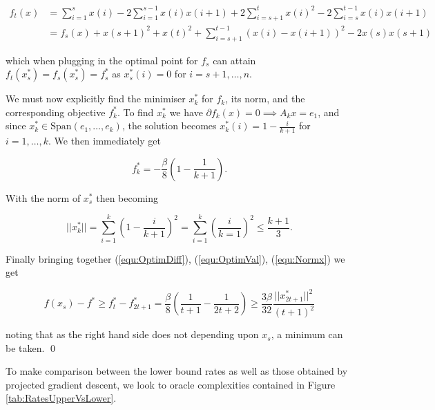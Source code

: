\begin{align*}
f_t(x) & = \sum_{i=1}^s x(i) - 2 \sum_{i=1}^{s-1} x(i)x(i+1) + 2 \sum_{i=s+1}^t x(i)^2 - 2 \sum_{i=s}^{t-1}x(i)x(i+1) \\
&= f_s(x) + x(s+1)^2+ x(t)^2 + \sum_{i=s+1}^{t-1} (x(i) - x(i+1))^2 - 2x(s)x(s+1)
\end{align*}


which when plugging in the optimal point for $f_s$ can attain $f_t(x_s^*) = f_s(x_s^*) = f^*_s$ as $x_s^*(i) = 0$ for $i = s+1,\dots,n$. 

We must now explicitly find the minimiser $x^*_k$ for $f_k$, its norm, and the corresponding objective $f_k^*$.  To find $x_k^*$ we have $\partial f_k(x) = 0 \implies A_k x = e_1$, and since $x_k^* \in \text{Span}(e_1,\dots,e_k)$, the solution becomes $x_k^*(i) = 1  - \frac{i}{k+1}$ for $i=1,\dots,k$. We then immediately get

\begin{equation}
f_k^* = - \frac{\beta}{8}\left( 1 - \frac{1}{k+1}\right).
\label{equ:OptimVal}
\end{equation}

With the norm of $x_s^*$ then becoming 

\begin{equation}
||x_k^*|| = \sum_{i=1}^k \left( 1 - \frac{i}{k+1}\right)^2 = \sum_{i=1}^k \left( \frac{i}{k=1}\right)^2 \leq \frac{k+1}{3}.
\label{equ:Normx}
\end{equation}

Finally bringing together (\ref{equ:OptimDiff}), (\ref{equ:OptimVal}), (\ref{equ:Normx}) we get

\begin{equation*}
f(x_s)- f^* \geq f_t^* - f_{2t + 1}^* = \frac{\beta}{8}\left( \frac{1}{t+1} - \frac{1}{2t + 2}\right) \geq \frac{3 \beta}{32} \frac{||x_{2t + 1}^*||^2}{(t+1)^2}
\end{equation*}

noting that as the right hand side does not depending upon $x_s$, a minimum can be taken. \qed


To make comparison between the lower bound rates as well as those obtained by projected gradient descent, we look to oracle complexities contained in Figure \ref{tab:RatesUpperVsLower}.  

